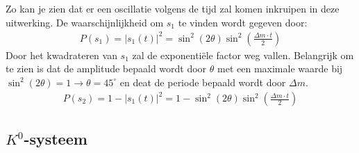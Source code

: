 \documentclass[../main.tex]{subfiles}
\begin{document}
Zo kan je zien dat er een oscillatie volgens de tijd zal komen inkruipen in deze uitwerking. De waarschijnlijkheid om $s_1$ te vinden wordt gegeven door:
\begin{equation}
    \begin{aligned}
        \label{eq:voorbeeld_osc_stable_massa_prob_1}
        P\left(s_{1}\right)=\left|s_{1}(t)\right|^{2}=\sin ^{2}(2 \theta) \sin ^{2}\left(\frac{\Delta m \cdot t}{2}\right)
    \end{aligned}
\end{equation}
Door het kwadrateren van $s_1$ zal de exponentiële factor weg vallen. Belangrijk om te zien is dat de amplitude bepaald wordt door $\theta$ met een maximale waarde bij $\sin^2(2\theta)=1 \rightarrow \theta=45^\circ$ en deat de periode bepaald wordt door $\Delta m$.
\begin{equation}
    \begin{aligned}
        \label{eq:voorbeeld_osc_stable_massa_prob_2}
        P\left(s_{2}\right)=1-\left|s_{1}(t)\right|^{2}=1-\sin ^{2}(2 \theta) \sin ^{2}\left(\frac{\Delta m \cdot t}{2}\right)
    \end{aligned}
\end{equation}

\subsection{$K^0$-systeem}%
\label{sub:_k_0_systeem}
\end{document}
